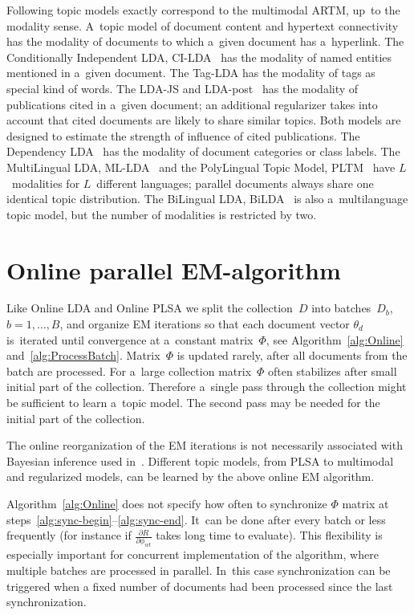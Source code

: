 \documentclass{acm_proc_article-sp}
\begin{document}
Following topic models exactly correspond to the multimodal ARTM,
up~to the modality sense.
A~topic model of document content and hypertext connectivity~\cite{cohn00missing}
has the modality of documents to which a~given document has a~hyperlink.
The Conditionally Independent LDA, CI-LDA~\cite{newman06entity}
has the modality of named entities mentioned in a~given document.
The Tag-LDA \cite{si09taglda}
has the modality of tags as special kind of words.
The LDA-JS and LDA-post~\cite{dietz07unsupervised}
has the modality of publications cited in a~given document;
an additional regularizer takes into account that cited documents are likely to share similar topics.
Both models are designed to estimate the strength of influence of cited publications.
The Dependency LDA~\cite{rubin12statistical}
has the modality of document categories or class labels.
The MultiLingual LDA, ML-LDA~\cite{ni09mining} and
the PolyLingual Topic Model, PLTM~\cite{mimno09polylingual}
have $L$~modalities for $L$~different languages;
parallel documents always share one identical topic distribution.
The BiLingual LDA, BiLDA~\cite{smet09weblinking}
is also a~multilanguage topic model, but the number of modalities is restricted by two.


\section{Online parallel EM-algorithm}
\label{sec:Online}

Like Online LDA \cite{hoffman10online} and Online PLSA \cite{bassiou14online}
we split the collection~$D$ into batches~$D_b$, ${b=1,\dots,B}$,
and organize EM iterations so that
each document vector $\theta_d$ is~iterated until convergence at a~constant matrix~$\Phi$,
see Algorithm~\ref{alg:Online} and~\ref{alg:ProcessBatch}.
Matrix~$\Phi$ is updated rarely, after all documents from the batch are processed.
For a~large collection
matrix~$\Phi$ often stabilizes after small initial part of the collection.
Therefore a~single pass through the collection might be sufficient to learn a~topic model.
The second pass may be needed for the initial part of the collection.

The online reorganization of the EM iterations
is not necessarily associated with Bayesian inference used in~\cite{hoffman10online}.
Different topic models, from PLSA to multimodal and regularized models,
can be learned by the above online EM algorithm.

Algorithm~\ref{alg:Online} does not specify how often to synchronize $\Phi$ matrix
at steps~\ref{alg:sync-begin}--\ref{alg:sync-end}.
It~can be done after every batch or less frequently
(for instance if $\frac{\partial R}{\partial \phi_{wt}}$ takes long time to evaluate).
This flexibility is especially important for concurrent implementation of the algorithm,
where multiple batches are processed in parallel.
In~this case synchronization can be triggered when a fixed number of documents had been processed since the last synchronization.
\end{document}
